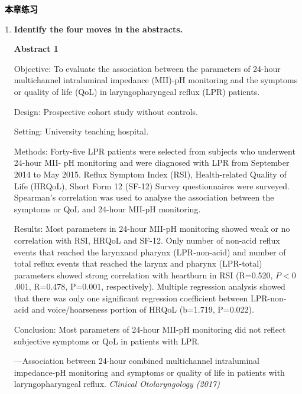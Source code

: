 \documentclass[a4paper]{ctexbook}
\newenvironment{problemset}[1][本章练习]{
  \begin{center}
    \phantomsection\addcontentsline{toc}{section}{\texorpdfstring{本章练习}{Exercice}}
    \markright{#1}
    \textcolor{black}{\Large\bfseries\adftripleflourishleft~#1~\adftripleflourishright}
  \end{center}
  \begin{enumerate}}{
  \end{enumerate}}
\begin{document}
\begin{problemset}
  \item \textbf{Identify the four moves in the abstracts.}
  
  \textbf{Abstract 1}

  \hspace*{2em}Objective: To evaluate the association between the parameters of 24-hour multichannel intraluminal impedance (MII)-pH monitoring and the symptoms or quality of life (QoL) in laryngopharyngeal reflux (LPR) patients.
  
  \hspace*{2em}Design: Prospective cohort study without controls.
  
  \hspace*{2em}Setting: University teaching hospital.
  
  \hspace*{2em}Methods: Forty-five LPR patients were selected from subjects who underwent 24-hour MII-
  pH monitoring and were diagnosed with LPR from September 2014 to May 2015. Reflux Symptom Index (RSI), Health-related Quality of Life (HRQoL), Short Form 12 (SF-12) Survey questionnaires were surveyed. Spearman's correlation was used to analyse the association between the symptoms or QoL and 24-hour MII-pH monitoring.
  
  \hspace*{2em}Results: Most parameters in 24-hour MII-pH monitoring showed weak or no correlation with RSI, HRQoL and SF-12. Only number of non-acid reflux events that reached the larynxand pharynx (LPR-non-acid) and number of total reflux events that reached the larynx and pharynx (LPR-total) parameters showed strong correlation with heartburn in RSI (R=0.520, $P<0$.001, R=0.478, P=0.001, respectively). Multiple regression analysis showed that there was only one significant regression coefficient between LPR-non-acid and voice/hoarseness portion of HRQoL (b=1.719, P=0.022).
  
  \hspace*{2em}Conclusion: Most parameters of 24-hour MII-pH monitoring did not reflect subjective symptoms or QoL in patients with LPR.
  
  \begin{flushright}
    ---Association between 24-hour combined multichannel intraluminal impedance-pH monitoring and symptoms or quality of life in patients with laryngopharyngeal reflux. \emph{Clinical Otolaryngology (2017)}
  \end{flushright}
  

\end{problemset}
\end{document}
